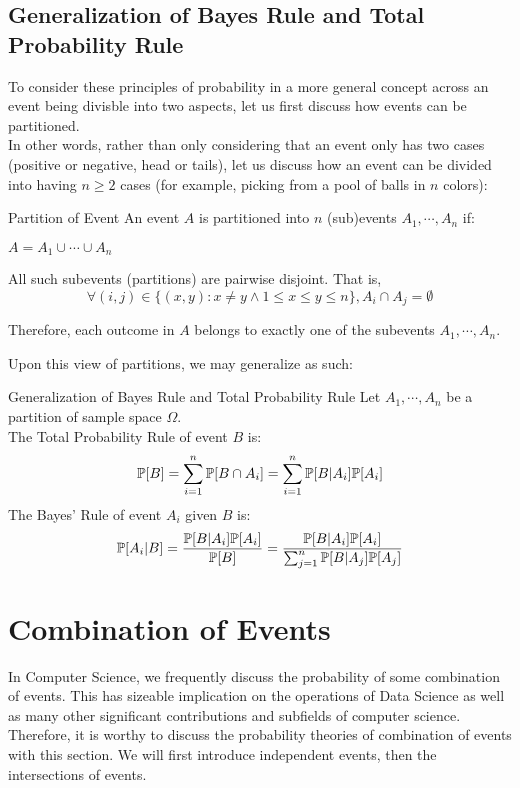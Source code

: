 \subsection{Generalization of Bayes Rule and Total Probability Rule}
To consider these principles of probability in a more general concept across an event being divisble into two aspects, let us first discuss how events can be partitioned. \\
In other words, rather than only considering that an event only has two cases (positive or negative, head or tails), let us discuss how an event can be divided into having $n \geq 2$ cases (for example, picking from a pool of balls in $n$ colors):
\begin{ln-define}{Partition of Event}{}
    An event $A$ is partitioned into $n$ (sub)events $A_1, \cdots, A_n$ if:
    \begin{bindenum}
        \item $A = A_1 \cup \cdots \cup A_n$
        \item {
            All such subevents (partitions) are pairwise disjoint. That is,
            \[\forall (i, j) \in \{(x, y) : x \neq y \land 1 \leq x \leq y \leq n\}, A_i \cap A_j = \emptyset\]
        }
    \end{bindenum}
    Therefore, each outcome in $A$ belongs to exactly one of the subevents $A_1, \cdots, A_n$.
\end{ln-define}
Upon this view of partitions, we may generalize as such:
\begin{ln-define}{Generalization of Bayes Rule and Total Probability Rule}{}
    Let $A_1, \cdots, A_n$ be a partition of sample space $\Omega$. \\
    The Total Probability Rule of event $B$ is:
    \[\P[B] = \sum_{i = 1}^n \P[B \cap A_i] = \sum_{i = 1}^n \P[B | A_i] \P[A_i]\]
    The Bayes' Rule of event $A_i$ given $B$ is:
    \[\P[A_i | B] = \frac{\P[B | A_i] \P[A_i]}{\P[B]} = \frac{\P[B | A_i] \P[A_i]}{\sum_{j = 1}^n \P[B | A_j] \P[A_j]}\]
\end{ln-define}

\section{Combination of Events}
In Computer Science, we frequently discuss the probability of some combination of events. This has sizeable implication on the operations of Data Science as well as many other significant contributions and subfields of computer science. \\
Therefore, it is worthy to discuss the probability theories of combination of events with this section. We will first introduce independent events, then the intersections of events.

